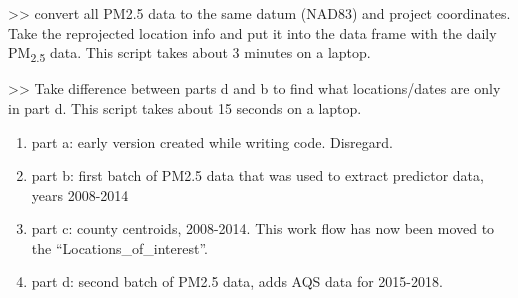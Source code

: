 \begin{enumerate}[nolistsep]
\begin{enumerate}[nolistsep]
	\end{enumerate}

 >> convert all PM2.5 data to the same datum (NAD83) and project coordinates. Take the reprojected location info and put it into the data frame with the daily PM\textsubscript{2.5} data. This script takes about 3 minutes on a laptop.


 >> Take difference between parts d and b to find what locations/dates are only in part d. This script takes about 15 seconds on a laptop. %
\begin{enumerate}
\item part a: early version created while writing code. Disregard.
\item part b: first batch of PM2.5 data that was used to extract predictor data, years 2008-2014
\item part c: county centroids, 2008-2014. This work flow has now been moved to the ``Locations\_of\_interest''.
\item part d: second batch of PM2.5 data, adds AQS data for 2015-2018.


\end{enumerate}
\end{enumerate}
